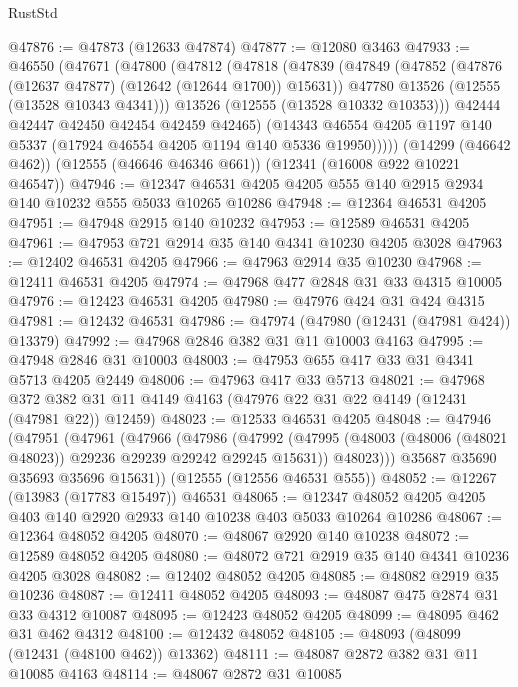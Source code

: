 \begin{lexlean}{RustStd}
\begin{coremodule}
@47876 := @47873 (@12633 @47874)
@47877 := @12080 @3463
@47933 := @46550
    (@47671
      (@47800
        (@47812
          (@47818
            (@47839
              (@47849
                (@47852 (@47876 (@12637 @47877) (@12642 (@12644 @1700)) @15631))
                @47780
                @13526
                (@12555 (@13528 @10343 @4341)))
              @13526
              (@12555 (@13528 @10332 @10353)))
            @42444
            @42447
            @42450
            @42454
            @42459
            @42465)
          (@14343 @46554 @4205 @1197 @140 @5337 (@17924 @46554 @4205 @1194 @140 @5336 @19950)))))
    (@14299 (@46642 @462))
    (@12555 (@46646 @46346 @661))
    (@12341 (@16008 @922 @10221 @46547))
@47946 := @12347 @46531 @4205 @4205 @555 @140 @2915 @2934 @140 @10232 @555 @5033 @10265 @10286
@47948 := @12364 @46531 @4205
@47951 := @47948 @2915 @140 @10232
@47953 := @12589 @46531 @4205
@47961 := @47953 @721 @2914 @35 @140 @4341 @10230 @4205 @3028
@47963 := @12402 @46531 @4205
@47966 := @47963 @2914 @35 @10230
@47968 := @12411 @46531 @4205
@47974 := @47968 @477 @2848 @31 @33 @4315 @10005
@47976 := @12423 @46531 @4205
@47980 := @47976 @424 @31 @424 @4315
@47981 := @12432 @46531
@47986 := @47974 (@47980 (@12431 (@47981 @424)) @13379)
@47992 := @47968 @2846 @382 @31 @11 @10003 @4163
@47995 := @47948 @2846 @31 @10003
@48003 := @47953 @655 @417 @33 @31 @4341 @5713 @4205 @2449
@48006 := @47963 @417 @33 @5713
@48021 := @47968
    @372
    @382
    @31
    @11
    @4149
    @4163
    (@47976 @22 @31 @22 @4149 (@12431 (@47981 @22)) @12459)
@48023 := @12533 @46531 @4205
@48048 := @47946
    (@47951
      (@47961
        (@47966
          (@47986
            (@47992
              (@47995 (@48003 (@48006 (@48021 @48023)) @29236 @29239 @29242 @29245 @15631))
              @48023)))
        @35687
        @35690
        @35693
        @35696
        @15631))
    (@12555 (@12556 @46531 @555))
@48052 := @12267 (@13983 (@17783 @15497)) @46531
@48065 := @12347 @48052 @4205 @4205 @403 @140 @2920 @2933 @140 @10238 @403 @5033 @10264 @10286
@48067 := @12364 @48052 @4205
@48070 := @48067 @2920 @140 @10238
@48072 := @12589 @48052 @4205
@48080 := @48072 @721 @2919 @35 @140 @4341 @10236 @4205 @3028
@48082 := @12402 @48052 @4205
@48085 := @48082 @2919 @35 @10236
@48087 := @12411 @48052 @4205
@48093 := @48087 @475 @2874 @31 @33 @4312 @10087
@48095 := @12423 @48052 @4205
@48099 := @48095 @462 @31 @462 @4312
@48100 := @12432 @48052
@48105 := @48093 (@48099 (@12431 (@48100 @462)) @13362)
@48111 := @48087 @2872 @382 @31 @11 @10085 @4163
@48114 := @48067 @2872 @31 @10085

\end{coremodule}
\end{lexlean}
